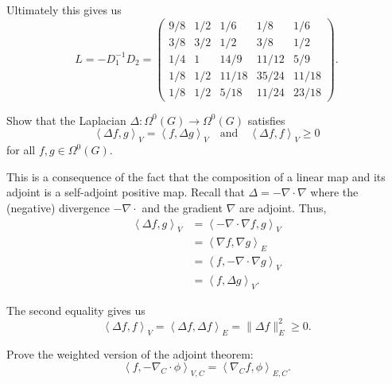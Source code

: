 \documentclass[12 pt, letterpaper]{hmcpset}
\begin{document}
\begin{solution}
\begin{enumerate}
		Ultimately this gives us
		\[
			L = -D_{1}^{-1} D_{2} = \begin{pmatrix}
				9/8 & 1/2 & 1/6 & 1/8 & 1/6 \\
				3/8 & 3/2 & 1/2 & 3/8 & 1/2 \\
				1/4 & 1	& 14/9 & 11/12 & 5/9 \\
				1/8 & 1/2 & 11/18 & 35/24 & 11/18 \\
				1/8 & 1/2 & 5/18 & 11/24 & 23/18
			\end{pmatrix}.
		\]
	\end{enumerate}
\end{solution}

\pagebreak

\begin{problem}[42.]
	Show that the Laplacian $\Delta : \Omega^{0}(G) \to \Omega^{0}(G)$ satisfies
	\[
		\left < \Delta f, g \right >_{V} = \left < f, \Delta g \right >_{V} \quad \text{and} \quad \left < \Delta f, f \right >_{V} \ge 0
	\]
	for all $f, g \in \Omega^{0}(G)$.
\end{problem}

\begin{solution}
	This is a consequence of the fact that the composition of a linear map and its adjoint is a self-adjoint positive map. Recall that $\Delta = - \nabla \cdot \nabla$ where the (negative) divergence $-\nabla \cdot$ and the gradient $\nabla$ are adjoint. Thus,
	\begin{align*}
		\left < \Delta f, g \right >_{V} & = \left < - \nabla \cdot \nabla f, g \right >_{V} \\
						 & = \left < \nabla f, \nabla g \right >_{E} \\
						 & = \left < f, - \nabla \cdot \nabla g \right >_{V} \\
						 & = \left < f, \Delta g \right >_{V}.
	\end{align*}

	The second equality gives us
	\[
		\left < \Delta f, f \right >_{V} = \left < \Delta f, \Delta f \right >_{E} = \lVert \Delta f \rVert_{E}^{2} \ge 0.
	\]
\end{solution}

\pagebreak

\begin{problem}[43.]
	Prove the weighted version of the adjoint theorem:
	\[
		\left < f, - \nabla_{C} \cdot \phi \right >_{V, C} = \left < \nabla_{C} f, \phi \right >_{E, C}.
	\]
\end{problem}
\end{document}
